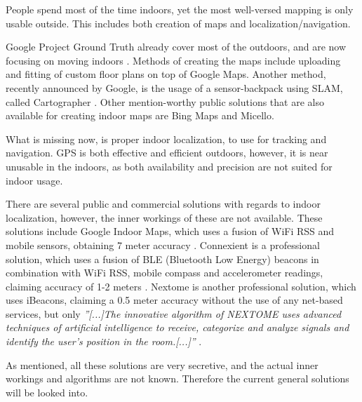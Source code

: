 
People spend most of the time indoors, yet the most well-versed mapping is only usable outside.
This includes both creation of maps and localization/navigation.

Google Project Ground Truth\cite{googleio_ground_truth} already cover most of the outdoors, and are now focusing on moving indoors \cite{googleio_indoor_maps}\cite{indoor_maps_google_slides}.
Methods of creating the maps include uploading and fitting of custom floor plans on top of Google Maps.
Another method, recently announced by Google, is the usage of a sensor-backpack using SLAM, called Cartographer \cite{cartographer}.
Other mention-worthy public solutions that are also available for creating indoor maps are Bing Maps\cite{bingmaps} and Micello\cite{micello}.

What is missing now, is proper indoor localization, to use for tracking and navigation.
GPS is both effective and efficient outdoors, however, it is near unusable in the indoors, as both availability and precision are not suited for indoor usage.

There are several public and commercial solutions with regards to indoor localization, however, the inner workings of these are not available.
These solutions include Google Indoor Maps, which uses a fusion of WiFi RSS and mobile sensors, obtaining 7 meter accuracy \cite{googleio_indoor_maps}.
Connexient is a professional solution, which uses a fusion of BLE (Bluetooth Low Energy) beacons in combination with WiFi RSS, mobile compass and accelerometer readings, claiming accuracy of 1-2 meters \cite{connexient_indoor_pos}.
Nextome is another professional solution, which uses iBeacons\cite{ibeacon}, claiming a 0.5 meter accuracy without the use of any net-based services, but only \textit{''[...]The innovative algorithm of NEXTOME uses advanced techniques of artificial intelligence to receive, categorize and analyze signals and identify the user’s position in the room.[...]''} \cite{nextome_indoor_pos}.

As mentioned, all these solutions are very secretive, and the actual inner workings and algorithms are not known.
Therefore the current general solutions will be looked into.
